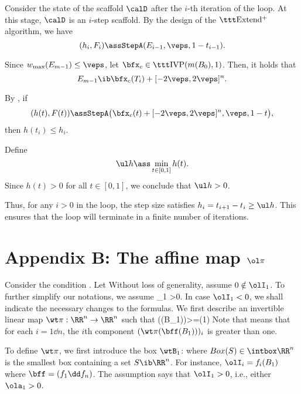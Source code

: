 	Consider the state of the scaffold $ \calD $ after the $ i $-th
	iteration of the loop. At this stage, $ \calD $ is an $ i $-step
	scaffold. By the design of the $\Extender$ algorithm, we have 
	\[
	(h_i, F_i) \ass \stepA(E_{i-1}, \veps, 1 - t_{i-1}).
	\]
	
	
	Since $ \wmax(E_{m-1}) \leq \veps $, let $ \bfx_c \in \ivp(m(B_0), 1)
	$. Then, it holds that 
	\[
	E_{m-1} \ib \bfx_c(T_i) + [-2\veps, 2\veps]^n.
	\]
	
	By , if 
	\[
	(h(t), F(t)) \ass \stepA\big(\bfx_c(t) + [-2\veps, 2\veps]^n, \veps, 1
	- t\big),
	\] 
	then $ h(t_i) \leq h_i $.
	
	Define 
	\[
	\ul h \ass \min_{t \in [0, 1]} h(t).
	\]
	Since $ h(t) > 0 $ for all $ t \in [0, 1] $,  we conclude that $ \ul h
	> 0 $. 
	
	Thus, for any $ i > 0 $ in the loop, the step size satisfies $ h_i =
	t_{i+1} - t_i \geq \ul h $. This ensures that the loop will terminate
	in a finite number of iterations.
	\epf

\section{Appendix B: The  affine map $\ol\pi$}
	Consider the condition .
	Let 
	Without loss of generality, assume
	$0 \notin \olI_1$.  To further simplify our
	notations, we assume
	\olI_1 >0.
	\eeql  
	In case $\olI_1<0$, we shall indicate the necessary changes
	to the formulas.
	We first describe an invertible linear map
	$\wt\pi:\RR^n\to\RR^n$
	such that
	\wt\pi(\bff(B_1))>\1=(1)
	\qquad{}
	\eeql
	Note that  means that for each $i=1\dd n$,
	the $i$th component $(\wt\pi(\bff(B_1)))_i$ is greater than one.
	
	To define $\wt\pi$, we first introduce the box $\wtB_1$:
	 \eeql
	where $Box(S)\in\intbox\RR^n$ is the smallest
	box containing a set $S\ib\RR^n$.
	For instance, $\olI_i=f_i(B_1)$ where $\bff=(f_1\dd f_n)$.
	The assumption  says that
	$ \olI_1>0$, i.e., either $\ola_1>0$.
	
